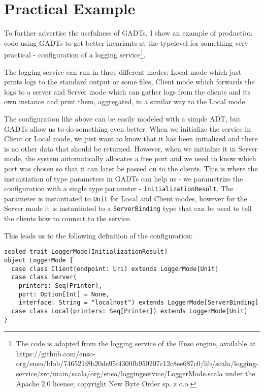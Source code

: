 \section{Practical Example}

To further advertise the usefulness of GADTs, I show an example of production code using GADTs to get better invariants at the typelevel for something very practical - configuration of a logging service\footnote{The code is adapted from the logging service of the Enso engine, available at https://github.com/enso-org/enso/blob/746521f8b20de95f4300fb950207c12c8ee687c0/lib/scala/logging-service/src/main/scala/org/enso/loggingservice/LoggerMode.scala under the Apache 2.0 license; copyright New Byte Order sp. z o.o.}.

The logging service can run in three different modes: Local mode which just prints logs to the standard output or some files, Client mode which forwards the logs to a server and Server mode which can gather logs from the clients and its own instance and print them, aggregated, in a similar way to the Local mode.

The configuration like above can be easily modeled with a simple ADT, but GADTs allow us to do something even better. When we initialize the service in Client or Local mode, we just want to know that it has been initialized and there is no other data that should be returned. However, when we initialize it in Server mode, the system automatically allocates a free port and we need to know which port was chosen so that it can later be passed on to the clients. This is where the instantiation of type parameters in GADTs can help us - we parametrize the configuration with a single type parameter - \texttt{InitializationResult}. The parameter is instantiated to \texttt{Unit} for Local and Client modes, however for the Server mode it is instantiated to a \texttt{ServerBinding} type that can be used to tell the clients how to connect to the service.

This leads us to the following definition of the configuration:

\begin{verbatim}
sealed trait LoggerMode[InitializationResult]
object LoggerMode {
  case class Client(endpoint: Uri) extends LoggerMode[Unit]
  case class Server(
    printers: Seq[Printer], 
    port: Option[Int] = None, 
    interface: String = "localhost") extends LoggerMode[ServerBinding]
  case class Local(printers: Seq[Printer]) extends LoggerMode[Unit]
}
\end{verbatim}

